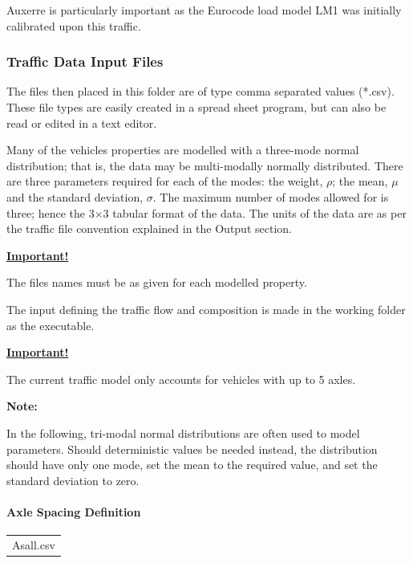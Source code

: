 \documentclass[
]{article}
\begin{document}
Auxerre is particularly important as the Eurocode load model LM1 was
initially calibrated upon this traffic.

\subsubsection*{Traffic Data Input
Files}\label{traffic-data-input-files}

The files then placed in this folder are of type comma separated values
(*.csv). These file types are easily created in a spread sheet program,
but can also be read or edited in a text editor.

Many of the vehicles properties are modelled with a three-mode normal
distribution; that is, the data may be multi-modally normally
distributed. There are three parameters required for each of the modes:
the weight, $\rho$; the mean, $\mu$ and the standard deviation,
$\sigma$. The maximum number of modes allowed for is three; hence the
3×3 tabular format of the data. The units of the data are as per the
traffic file convention explained in the Output section.

\textbf{\ul{Important!}}

The files names must be as given for each modelled property.

The input defining the traffic flow and composition is made in the
working folder as the executable.

\textbf{\ul{Important!}}

The current traffic model only accounts for vehicles with up to 5 axles.

\textbf{Note:}

In the following, tri-modal normal distributions are often used to model
parameters. Should deterministic values be needed instead, the
distribution should have only one mode, set the mean to the required
value, and set the standard deviation to zero.

\paragraph*{\texorpdfstring{\hfill\break
Axle Spacing
Definition}{ Axle Spacing Definition}}\label{axle-spacing-definition}

\begin{longtable}[]{@{}
  >{\centering\arraybackslash}p{}@{}}
\toprule\noalign{}
\endhead
\bottomrule\noalign{}
\endlastfoot
Asall.csv \\
\end{longtable}
\end{document}
